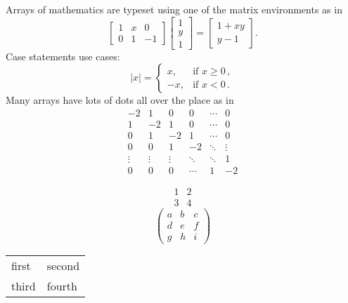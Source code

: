 \documentclass{memoir}
\begin{document}
Arrays of mathematics are typeset using one of the matrix environments as 
in
\[
	\begin{bmatrix}
		1 & x & 0 \\
		0 & 1 & -1
	\end{bmatrix}\begin{bmatrix}
		1  \\
		y  \\
		1
	\end{bmatrix}
	=\begin{bmatrix}
		1+xy  \\
		y-1
	\end{bmatrix}.
\]
Case statements use cases:
\[
	|x|=\begin{cases}
		x, & \text{if }x\geq 0\,,  \\
		-x, & \text{if }x< 0\,.
	\end{cases}
\]
Many arrays have lots of dots all over the place as in
\[
	\begin{matrix}
		-2 & 1 & 0 & 0 & \cdots & 0  \\
		1 & -2 & 1 & 0 & \cdots & 0  \\
		0 & 1 & -2 & 1 & \cdots & 0  \\
		0 & 0 & 1 & -2 & \ddots & \vdots \\
		\vdots & \vdots & \vdots & \ddots & \ddots & 1  \\
		0 & 0 & 0 & \cdots & 1 & -2
	\end{matrix}
\]

\[
  \begin{matrix}
    1 & 2\\
    3 & 4
  \end{matrix}
\]
\[ \left( \begin{array}{ccc}
      a & b & c \\
      d & e & f \\
      g & h & i \end{array} \right)
\] 

\begin{tabular}{ll}
first & second\\
third&fourth\\
\end{tabular}
\end{document}
